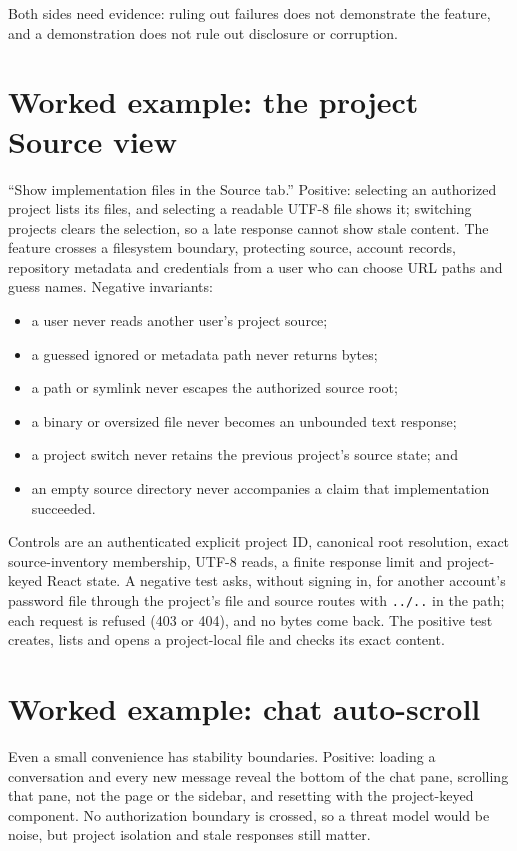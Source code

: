 Both sides need evidence: ruling out failures does not demonstrate the feature, and
a demonstration does not rule out disclosure or corruption.

\section{Worked example: the project Source view}

``Show implementation files in the Source tab.'' Positive: selecting an authorized
project lists its files, and selecting a readable UTF-8 file shows it; switching
projects clears the selection, so a late response cannot show stale content. The
feature crosses a filesystem boundary, protecting source, account records,
repository metadata and credentials from a user who can choose URL paths and guess
names. Negative invariants:

\begin{itemize}
  \item a user never reads another user's project source;
  \item a guessed ignored or metadata path never returns bytes;
  \item a path or symlink never escapes the authorized source root;
  \item a binary or oversized file never becomes an unbounded text response;
  \item a project switch never retains the previous project's source state; and
  \item an empty source directory never accompanies a claim that implementation
        succeeded.
\end{itemize}

Controls are an authenticated explicit project ID, canonical root resolution,
exact source-inventory membership, UTF-8 reads, a finite response limit and
project-keyed React state. A negative test asks, without signing in, for another
account's password file through the project's file and source routes with
\texttt{../..} in the path; each request is refused (403 or 404), and no bytes come
back.
The positive test creates, lists and opens a project-local file and checks its
exact content.

\section{Worked example: chat auto-scroll}

Even a small convenience has stability boundaries. Positive: loading a
conversation and every new message reveal the bottom of the chat pane, scrolling
that pane, not the page or the sidebar, and resetting with the project-keyed
component. No authorization boundary is crossed, so a threat model would be noise,
but project isolation and stale responses still matter.

